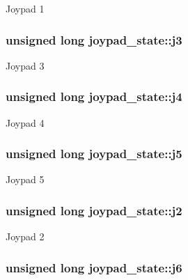 Joypad 1 \hypertarget{structjoypad__state_7b9bb639ecaea5f5cc38693b7c876cc3}{
\subsubsection{\setlength{\rightskip}{0pt plus 5cm}unsigned long {\bf joypad\_\-state::j3}}}
\label{structjoypad__state_7b9bb639ecaea5f5cc38693b7c876cc3}


Joypad 3 \hypertarget{structjoypad__state_40d75ff6dabb3b5101ae03dbec27a13f}{
\subsubsection{\setlength{\rightskip}{0pt plus 5cm}unsigned long {\bf joypad\_\-state::j4}}}
\label{structjoypad__state_40d75ff6dabb3b5101ae03dbec27a13f}


Joypad 4 \hypertarget{structjoypad__state_da972add2520e7e437514913300773d8}{
\subsubsection{\setlength{\rightskip}{0pt plus 5cm}unsigned long {\bf joypad\_\-state::j5}}}
\label{structjoypad__state_da972add2520e7e437514913300773d8}


Joypad 5 \hypertarget{structjoypad__state_c7491668ca373cf26025d334894a35b0}{
\subsubsection{\setlength{\rightskip}{0pt plus 5cm}unsigned long {\bf joypad\_\-state::j2}}}
\label{structjoypad__state_c7491668ca373cf26025d334894a35b0}


Joypad 2 \hypertarget{structjoypad__state_2330eb7fe4da3cddc6e0a286047c6b75}{
\subsubsection{\setlength{\rightskip}{0pt plus 5cm}unsigned long {\bf joypad\_\-state::j6}}}
\label{structjoypad__state_2330eb7fe4da3cddc6e0a286047c6b75}


